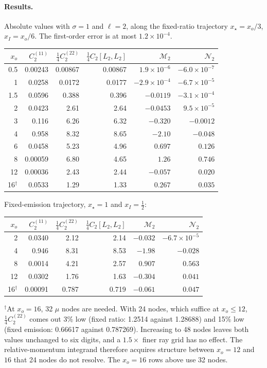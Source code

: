 \paragraph{Results.} Absolute values with $\sigma=1$ and $\ell=2$, along the fixed-ratio trajectory
$x_\star=x_o/3$, $x_I=x_o/6$. The first-order error is at most $1.2\times10^{-4}$.
\begin{center}
\begin{tabular}{rrrrrr}
\toprule
$x_o$ & $C_2^{(11)}$ & $\frac14C_2^{(22)}$ & $\frac14C_2[L_2,L_2]$ & $\mathcal M_2$ & $\mathcal N_2$\\\midrule
0.5 & 0.00243 & 0.00867 & 0.00867 & $1.9\times10^{-6}$ & $-6.0\times10^{-7}$\\
1   & 0.0258  & 0.0172  & 0.0177  & $-2.9\times10^{-4}$ & $-6.7\times10^{-5}$\\
1.5 & 0.0596  & 0.388   & 0.396   & $-0.0119$ & $-3.1\times10^{-4}$\\
2   & 0.0423  & 2.61    & 2.64    & $-0.0453$ & $9.5\times10^{-5}$\\
3   & 0.116   & 6.26    & 6.32    & $-0.320$  & $-0.0012$\\
4   & 0.958   & 8.32    & 8.65    & $-2.10$   & $-0.048$\\
6   & 0.0458  & 5.23    & 4.96    & $0.697$   & $0.126$\\
8   & 0.00059 & 6.80    & 4.65    & $1.26$    & $0.746$\\
12  & 0.00036 & 2.43    & 2.44    & $-0.057$  & $0.020$\\
16$^\dagger$ & 0.0533  & 1.29    & 1.33    & $0.267$   & $0.035$\\
\bottomrule
\end{tabular}
\end{center}
Fixed-emission trajectory, $x_\star=1$ and $x_I=\frac12$:
\begin{center}
\begin{tabular}{rrrrrr}
\toprule
$x_o$ & $C_2^{(11)}$ & $\frac14C_2^{(22)}$ & $\frac14C_2[L_2,L_2]$ & $\mathcal M_2$ & $\mathcal N_2$\\\midrule
2  & 0.0340 & 2.12 & 2.14 & $-0.032$ & $-6.7\times10^{-5}$\\
4  & 0.946  & 8.31 & 8.53 & $-1.98$  & $-0.028$\\
8  & 0.0014 & 4.21 & 2.57 & $0.907$  & $0.563$\\
12 & 0.0302 & 1.76 & 1.63 & $-0.304$ & $0.041$\\
16$^\dagger$ & 0.00091 & 0.787 & 0.719 & $-0.061$ & $0.047$\\
\bottomrule
\end{tabular}
\end{center}
\noindent$^\dagger$At $x_o=16$, 32 $\mu$ nodes are needed. With 24 nodes, which suffice at $x_o\le12$,
$\frac14C_2^{(22)}$ comes out 3\% low (fixed ratio: 1.2514 against 1.28688) and 15\% low (fixed emission: 0.66617
against 0.787269). Increasing to 48 nodes leaves both values unchanged to six digits, and a $1.5\times$ finer ray grid has
no effect. The relative-momentum integrand therefore acquires structure between $x_o=12$ and $16$ that 24 nodes do not
resolve. The $x_o=16$ rows above use 32 nodes.

